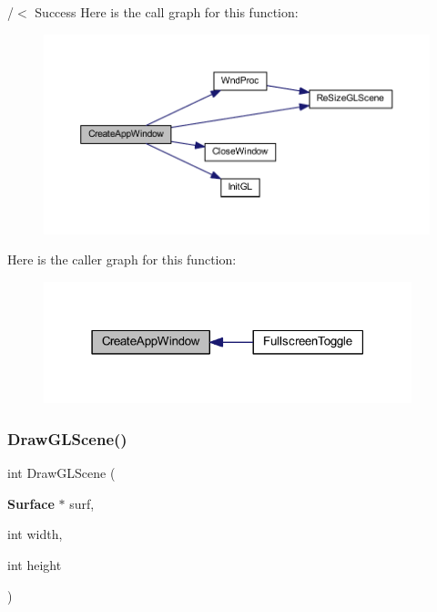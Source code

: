 /$<$ Success Here is the call graph for this function\+:\nopagebreak
\begin{figure}[H]
\begin{center}
\leavevmode
\includegraphics[width=350pt]{supportcode_8h_acd4be192aca2369a87f51d952150a77b_cgraph}
\end{center}
\end{figure}
Here is the caller graph for this function\+:\nopagebreak
\begin{figure}[H]
\begin{center}
\leavevmode
\includegraphics[width=303pt]{supportcode_8h_acd4be192aca2369a87f51d952150a77b_icgraph}
\end{center}
\end{figure}
\mbox{\label{supportcode_8h_ac43c2dc16b0859b03a4f7d04a7e97d3c}} 
\subsubsection{Draw\+G\+L\+Scene()}
{\footnotesize\ttfamily int Draw\+G\+L\+Scene (\begin{DoxyParamCaption}\item[{\textbf{ Surface} $\ast$}]{surf,  }\item[{int}]{width,  }\item[{int}]{height }\end{DoxyParamCaption})}

